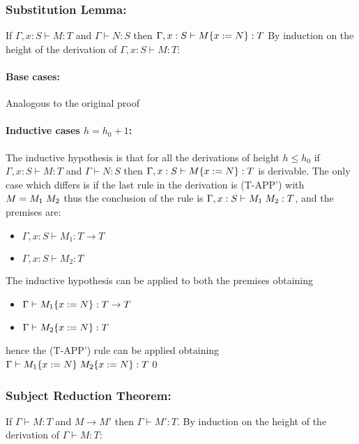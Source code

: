\subsubsection*{Substitution Lemma:}

If $\Gamma, x: S \vdash M: T$ and $\Gamma \vdash N: S$ then $\Gamma, x: S \vdash M\{x:=N\}: T$
By induction on the height of the derivation of $\Gamma, x: S \vdash M: T$:

\paragraph*{Base cases:\\}
Analogous to the original proof

\paragraph*{Inductive cases $h = h_0 + 1$:\\}

The inductive hypothesis is that for all the derivations of height $h \le h_0$ if
$\Gamma, x: S \vdash M: T$ and $\Gamma \vdash N: S$ then $\Gamma, x: S \vdash M\{x:=N\}: T$
is derivable.
The only case which differs is if the last rule in the derivation is (T-APP') with
$M = M_1\;M_2$ thus the conclusion of the rule is $\Gamma, x: S \vdash M_1\;M_2: T$,
and the premises are:
\begin{itemize}
	\item $\Gamma, x: S \vdash M_1 : T \to T$
	\item $\Gamma, x: S \vdash M_2: T$
\end{itemize}

The inductive hypothesis can be applied to both the premises obtaining
\begin{itemize}
	\item $\Gamma \vdash M_1\{x:=N\}: T \to T$
	\item $\Gamma \vdash M_2\{x:=N\}: T$
\end{itemize}
hence the (T-APP') rule can be applied obtaining
$\Gamma \vdash M_1\{x:=N\}\;M_2\{x:=N\}: T$\qed

\subsubsection*{Subject Reduction Theorem:}

If $\Gamma \vdash M: T$ and $M \to M'$ then $\Gamma \vdash M': T$.
By induction on the height of the derivation of $\Gamma \vdash M: T$:

